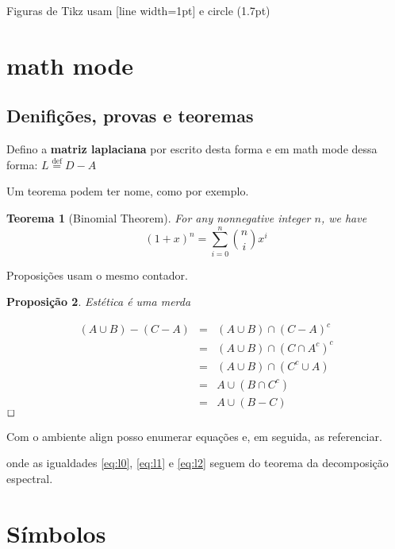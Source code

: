 \documentclass[]{article}
\newtheorem{theorem}{Teorema}
\newenvironment{proof}{\noindent{\bf Proof:}}{$\hfill \Box$ \vspace{10pt}}
\newtheorem{proposicao}[theorem]{{\bf Proposição}}
\newcommand{\defi}{\textbf}                  %
\newcommand{\defmm}{\overset{\text{def}}{=}} %
\newcommand{\transposta}{^\top}   %
\begin{document}
Figuras de Tikz usam [line width=1pt] e circle (1.7pt)


\section{math mode}

\subsection{Denifições, provas e teoremas}

Defino a \defi{matriz laplaciana} por escrito desta forma e em math mode dessa forma:
$ L \defmm D-A$

Um teorema podem ter nome, como por exemplo.

\begin{theorem}[Binomial Theorem]
For any nonnegative integer $n$, we have
$$(1+x)^n = \sum_{i=0}^n {n \choose i} x^i$$
\end{theorem}

Proposições usam o mesmo contador.
\begin{proposicao}
Estética é uma merda
\end{proposicao}

\begin{proof}
\begin{eqnarray*}
(A\cup B)-(C-A) &=& (A\cup B) \cap (C-A)^c\\
&=& (A\cup B) \cap (C \cap A^c)^c \\
&=& (A\cup B) \cap (C^c \cup A) \\
&=& A \cup (B\cap C^c) \\
&=& A \cup (B-C)
\end{eqnarray*}
\end{proof}

Com o ambiente align posso enumerar equações e, em seguida, as referenciar.

onde as igualdades \eqref{eq:l0}, \eqref{eq:l1} e \eqref{eq:l2} seguem do teorema da
decomposição espectral.

\section{Símbolos}
\end{document}

